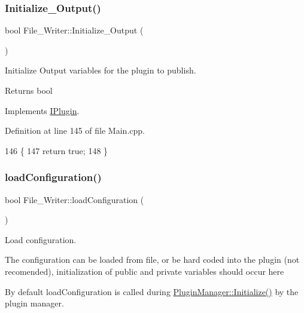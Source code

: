 \subsubsection{\texorpdfstring{Initialize\+\_\+\+Output()}{Initialize\_Output()}}
{\footnotesize\ttfamily bool File\+\_\+\+Writer\+::\+Initialize\+\_\+\+Output (\begin{DoxyParamCaption}{ }\end{DoxyParamCaption})\hspace{0.3cm}{\ttfamily [virtual]}}



Initialize Output variables for the plugin to publish. 

\begin{DoxyReturn}{Returns}
bool 
\end{DoxyReturn}


Implements \hyperlink{class_i_plugin_a0b772513fc8c4ed01240e19c4bb84068}{I\+Plugin}.



Definition at line 145 of file Main.\+cpp.


\begin{DoxyCode}
146 \{
147     \textcolor{keywordflow}{return} \textcolor{keyword}{true};
148 \}
\end{DoxyCode}
\mbox{\label{class_file___writer_a8f9010f501d8349bd9e8895405a8de8b}} 
\subsubsection{\texorpdfstring{load\+Configuration()}{loadConfiguration()}}
{\footnotesize\ttfamily bool File\+\_\+\+Writer\+::load\+Configuration (\begin{DoxyParamCaption}{ }\end{DoxyParamCaption})\hspace{0.3cm}{\ttfamily [virtual]}}



Load configuration. 

The configuration can be loaded from file, or be hard coded into the plugin (not recomended), initialization of public and private variables should occur here

By default load\+Configuration is called during \hyperlink{class_plugin_manager_a956e653b7db36da9d034b4a93c8308d5}{Plugin\+Manager\+::\+Initialize()} by the plugin manager.

